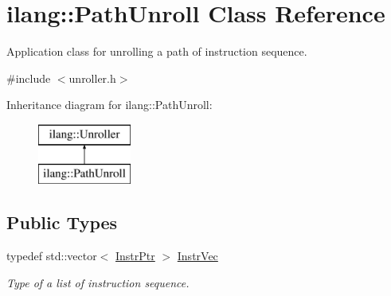 \hypertarget{classilang_1_1_path_unroll}{}\section{ilang\+:\+:Path\+Unroll Class Reference}
\label{classilang_1_1_path_unroll}


Application class for unrolling a path of instruction sequence.  




{\ttfamily \#include $<$unroller.\+h$>$}

Inheritance diagram for ilang\+:\+:Path\+Unroll\+:\begin{figure}[H]
\begin{center}
\leavevmode
\includegraphics[height=2.000000cm]{classilang_1_1_path_unroll}
\end{center}
\end{figure}
\subsection*{Public Types}
\begin{DoxyCompactItemize}
\item 
\mbox{\label{classilang_1_1_path_unroll_aae631abacb7a820ec67ae4d6aac916e0}} 
typedef std\+::vector$<$ \mbox{\hyperlink{namespaceilang_af88a19312ae653d687a0d1207bb284f6}{Instr\+Ptr}} $>$ \mbox{\hyperlink{classilang_1_1_path_unroll_aae631abacb7a820ec67ae4d6aac916e0}{Instr\+Vec}}
\begin{DoxyCompactList}\small\item\em Type of a list of instruction sequence. \end{DoxyCompactList}\end{DoxyCompactItemize}
